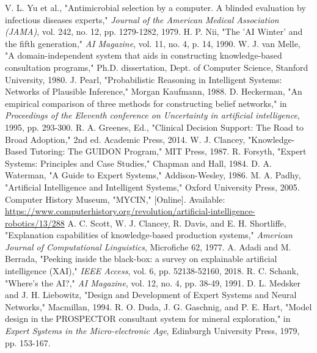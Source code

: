 \documentclass[conference]{IEEEtran}
\begin{document}
\begin{thebibliography}{00}
 V. L. Yu et al., "Antimicrobial selection by a computer. A blinded evaluation by infectious diseases experts," \textit{Journal of the American Medical Association (JAMA)}, vol. 242, no. 12, pp. 1279-1282, 1979.
 H. P. Nii, "The 'AI Winter' and the fifth generation," \textit{AI Magazine}, vol. 11, no. 4, p. 14, 1990.
 W. J. van Melle, "A domain-independent system that aids in constructing knowledge-based consultation programs," Ph.D. dissertation, Dept. of Computer Science, Stanford University, 1980.
 J. Pearl, "Probabilistic Reasoning in Intelligent Systems: Networks of Plausible Inference," Morgan Kaufmann, 1988.
 D. Heckerman, "An empirical comparison of three methods for constructing belief networks," in \textit{Proceedings of the Eleventh conference on Uncertainty in artificial intelligence}, 1995, pp. 293-300.
 R. A. Greenes, Ed., "Clinical Decision Support: The Road to Broad Adoption," 2nd ed. Academic Press, 2014.
 W. J. Clancey, "Knowledge-Based Tutoring: The GUIDON Program," MIT Press, 1987.
 R. Forsyth, "Expert Systems: Principles and Case Studies," Chapman and Hall, 1984.
 D. A. Waterman, "A Guide to Expert Systems," Addison-Wesley, 1986.
 M. A. Padhy, "Artificial Intelligence and Intelligent Systems," Oxford University Press, 2005.
 Computer History Museum, "MYCIN," [Online]. Available: \url{https://www.computerhistory.org/revolution/artificial-intelligence-robotics/13/288}
 A. C. Scott, W. J. Clancey, R. Davis, and E. H. Shortliffe, "Explanation capabilities of knowledge-based production systems," \textit{American Journal of Computational Linguistics}, Microfiche 62, 1977.
 A. Adadi and M. Berrada, "Peeking inside the black-box: a survey on explainable artificial intelligence (XAI)," \textit{IEEE Access}, vol. 6, pp. 52138-52160, 2018.
 R. C. Schank, "Where's the AI?," \textit{AI Magazine}, vol. 12, no. 4, pp. 38-49, 1991.
 D. L. Medsker and J. H. Liebowitz, "Design and Development of Expert Systems and Neural Networks," Macmillan, 1994.
 R. O. Duda, J. G. Gaschnig, and P. E. Hart, "Model design in the PROSPECTOR consultant system for mineral exploration," in \textit{Expert Systems in the Micro-electronic Age}, Edinburgh University Press, 1979, pp. 153-167.

\end{thebibliography}
\end{document}
